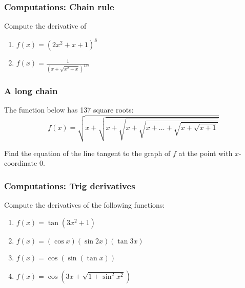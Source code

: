 \begin{frame}[t]
	\frametitle{Computations: Chain rule}

	Compute the derivative of

	\begin{enumerate}
		\item $\displaystyle f(x) = \left( 2x^{2}+x+1 \right)^{8}$

		\item $\displaystyle f(x) = \frac{1}{\left( x + \sqrt{x^2+x}\right)^{137}}$
	\end{enumerate}
\end{frame}

\begin{frame}[t]
	\frametitle{A long chain}

	The function below has 137 square roots:
	\[
		f(x) = \sqrt{x+ \sqrt{x +
		\sqrt{x + \sqrt{x+ \ldots + \sqrt{x + \sqrt{x+1}}}}}}
	\]

	Find the equation of the line tangent to the graph of $f$ at the point with
	$x$-coordinate $0$.
\end{frame}

\begin{frame}[t]
	\frametitle{Computations: Trig derivatives}

	Compute the derivatives of the following functions:

	\begin{enumerate}

		\item $\displaystyle f(x) = \tan (3x^{2}+1)$

			\vfill

		\item $\displaystyle f(x) = (\cos x )( \sin 2x )(\tan 3x)$

			\vfill

		\item $\displaystyle f(x) = \cos ( \sin( \tan x))$
			\vfill

		\item $\displaystyle f(x) = \cos \left( 3x + \sqrt{1 + \sin^{2}x^{2}}\right)$
			\vfill
	\end{enumerate}
\end{frame}

